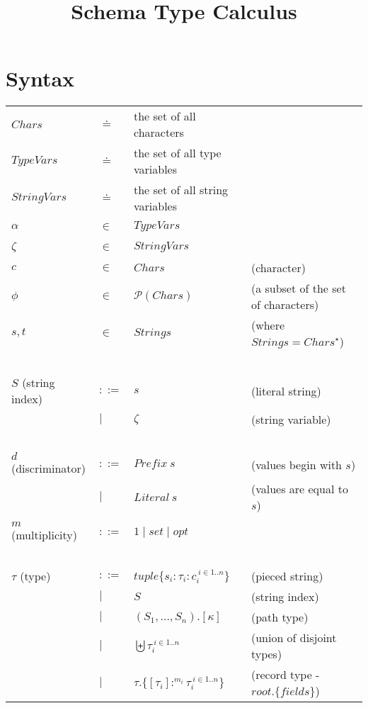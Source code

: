 \documentclass{article}
\title{Schema Type Calculus}
\begin{document}
\maketitle

\section*{Syntax}

\begin{tabular}{llll}
$\mathit{Chars}$ & $\doteq$ & the set of all characters \\
$\mathit{TypeVars}$ & $\doteq$ & the set of all type variables \\
$\mathit{StringVars}$ & $\doteq$ & the set of all string variables \\
$\alpha$ & $\in$ & $\mathit{TypeVars}$ & ~ \\
$\zeta$ & $\in$ & $\mathit{StringVars}$ & ~ \\
$c$ & $\in$ & $\mathit{Chars}$ & (character) \\
$\phi$ & $\in$ & $\mathcal P(\mathit{Chars})$ & (a subset of the set of characters) \\
$s,t$ & $\in$ & $\mathit{Strings}$ & (where $\mathit{Strings} = \mathit{Chars}^{\star}$) \\~\\
$S$ (string index) & $::=$ & $s$ & (literal string) \\
                   & $\mid$ & $\zeta$ & (string variable) \\~\\
$d$ (discriminator) & $::=$  & $\mathit{Prefix}~s$ & (values begin with $s$) \\
    & $\mid$ & $\mathit{Literal}~s$ & (values are equal to $s$) \\
 & & \\
$m$ (multiplicity) & $::=$ & $1 \mid \mathit{set} \mid \mathit{opt}$\\~\\
$\tau$ (type) & $::=$ & $\mathit{tuple} \{ s_i : \tau_i : c_i^{~i \in 1..n} \}$ & (pieced string) \\
       & $\mid$ & $S$ & (string index) \\
       & $\mid$ & $(S_1,\ldots,S_n).[\kappa]$ & (path type) \\
       & $\mid$ & $\biguplus \tau_i^{~i \in 1..n}$ & (union of disjoint types) \\ 
       & $\mid$ & $\tau.\{[\tau_i] :^{m_i} \tau_i ^{~i \in 1..n}\}$ & (record type - $\mathit{root}.\{ fields \}$) \\ 

\end{tabular}
\end{document}
